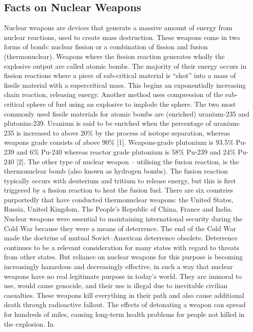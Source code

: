 \documentclass[twoside,titlepage,11pt,twocolumn,a4paper]{article}
\begin{document}
\subsection{Facts on Nuclear Weapons}
Nuclear weapons are devices that generate a massive amount of energy
from nuclear reactions, used to create mass destruction. These weapons
come in two forms of bomb: nuclear fission or a combination of fission
and fusion (thermonuclear). Weapons where the fission reaction
generates wholly the explosive output are called atomic bombs. The
majority of their energy occurs in fission reactions where a piece of
sub-critical material is ``shot'' into a mass of fissile material with
a supercritical mass. This begins an exponentially increasing chain
reaction, releasing energy. Another method uses compression of the
sub-critical sphere of fuel using an explosive to implode the
sphere. The two most commonly used fissile materials for atomic bombs
are (enriched) uranium-235 and plutonim-239. Uranium is said to be
enriched when the percentage of uranium-235 is increased to above 20\%
by the process of isotope separation, whereas weapons grade consists
of above 90\% [1]. Weapons-grade plutonium is 93.5\% Pu-239 and 6\%
Pu-240 whereas reactor grade plutonium is 58\% Pu-239 and 24\% Pu-240
[2].  The other type of nuclear weapon -- utilising the fusion
reaction, is the thermonuclear bomb (also known as hydrogen bombs).
The fusion reaction typically occurs with deuterium and tritium to
release energy, but this is first triggered by a fission reaction to
heat the fusion fuel. There are six countries purportedly that have
conducted thermonuclear weapons: the United States, Russia, United
Kingdom, The People's Republic of China, France and India.  Nuclear
weapons were essential to maintaining international security during
the Cold War because they were a means of deterrence. The end of the
Cold War made the doctrine of mutual Soviet--American deterrence
obsolete. Deterrence continues to be a relevant consideration for many
states with regard to threats from other states. But reliance on
nuclear weapons for this purpose is becoming increasingly hazardous
and decreasingly effective, in such a way that nuclear weapons have no
real legitimate purpose in today’s world. They are immoral to use,
would cause genocide, and their use is illegal due to inevitable
civilian casualties. These weapons kill everything in their path and
also cause additional death through radioactive fallout. The effects
of detonating a weapon can spread for hundreds of miles, causing
long-term health problems for people not killed in the explosion.  In
\end{document}
